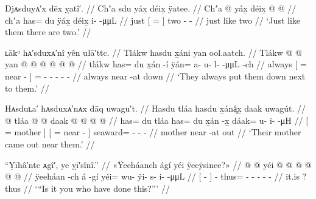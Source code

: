 \ex\label{ex:92-26-two-for-them}%
%
\begingl
	\glpreamble	Djᴀsduyᴀ′x dēx ỵatî′. //
	\glpreamble	Chʼa sdu yáx̱ déix̱ ÿatee. //
	\gla	Chʼa {}  @ {} yáx̱ {}
		déix̱  @ {} @ {} //
	\glb	chʼa {} has= du ÿáx̱ {}
		déix̱ i-  -μμL //
	\glc	just {}[ =   {}]
		two -  - //
	\gld	just {}  {} like {}
		two  {} {} //
	\glft	‘Just like them there are two.’
		//
\endgl
\xe

\ex\label{ex:92-27-always-put-down-next}%
%
\begingl
	\glpreamble	ʟākᵘ hᴀ′sduxᴀ′nî yên ułā′ttc. //
	\glpreamble	Tlákw hasdu x̱áni yan ool.aatch. //
	\gla	Tlákw {}  @ {}  @ {} {}
		yan @  @ {} @ {} @ {} @ {} @ {} //
	\glb	tlákw {} has= du x̱án -í {}
		ÿán= a- u- l-  -μμL -ch //
	\glc	always {}[ =  near - {}]
		= - - -
			 - - //
	\gld	always {}  {} near -at {}
		down  {} {} {} {} {} //
	\glft	‘They always put them down next to them.’
		//
\endgl
\xe

\ex\label{ex:92-28-mom-came}%
%
\begingl
	\glpreamble	Hᴀsduʟa′ hᴀsduxᴀ′nᴀx dāq uwagu′t. //
	\glpreamble	Hasdu tláa hasdu x̱áná̬x̱ daak uwagút. //
	\gla	{}  @ {} tláa {}
		{}  @ {}  @ {} {}
		daak @  @ {} @ {} @ {} //
	\glb	{} has= du tláa {}
		{} has= du x̱án -x̱ {}
		dáak= u- i-  -μH //
	\glc	{}[ =  mother {}]
		{}[ =  near - {}]
		seaward= - -  - //
	\gld	{}  {} mother {}
		{}  {} near -at {}
		out  {} {} {} //
	\glft	‘Their mother came out near them.’
		//
\endgl
\xe

\ex\label{ex:92-29-you-did-this}%
%
\begingl
	\glpreamble	“Ỵīhâ′ntc ᴀgî′, ye ỵī′sînî.” //
	\glpreamble	«\!Ÿeeháanch ágí yéi ÿeeÿsinee?\!» //
	\gla	{}  @ {} {}  @ {}
		yéi @  @ {} @ {} @ {} @ {} @ {} //
	\glb	{} ÿeeháan -ch {} á -gí
		yéi= wu- ÿi- s- i-  -μμL //
	\glc	{}[  - {}]  -
		thus= - - - -  - //
	\gld	{}  {} {} it.is \·?
		thus  {} {} {} {} {} //
	\glft	‘“Is it you who have done this?”’
		//
\endgl
\xe


